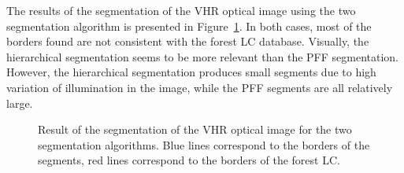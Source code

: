 The results of the segmentation of the VHR optical image using the two segmentation algorithm is presented in Figure~\ref{fig:seg_im}. In both cases, most of the borders found are not consistent with the forest LC database. Visually, the hierarchical segmentation seems to be more relevant than the PFF segmentation. However, the hierarchical segmentation produces small segments due to high variation of illumination in the image, while the PFF segments are all relatively large. 

\begin{figure}[htbp]
\begin{center}
\begingroup
\captionsetup[subfigure]{width=0.4\textwidth}
\hspace*{0.05\textwidth}
\endgroup
\caption{Result of the segmentation of the VHR optical image for the two segmentation algorithms. Blue lines correspond to the borders of the segments, red lines correspond to the borders of the forest LC.}
\label{fig:seg_im}
\end{center}
\end{figure}

